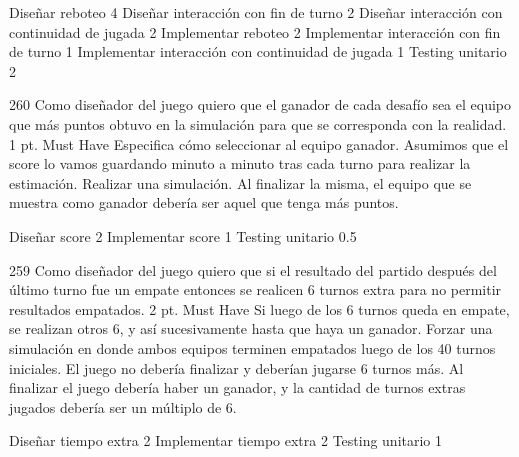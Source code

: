 \begin{taskstable}
 \task
 {Diseñar reboteo}
 {4}
 \task
 {Diseñar interacción con fin de turno}
 {2}
 \task
 {Diseñar interacción con continuidad de jugada}
 {2}
 \task
 {Implementar reboteo}
 {2}
 \task
 {Implementar interacción con fin de turno}
 {1}
 \task
 {Implementar interacción con continuidad de jugada}
 {1}
 \task
 {Testing unitario}
 {2}
\end{taskstable}

\vspace{1cm}


\sprintstory
{260}
{Como diseñador del juego quiero que el ganador de cada desafío sea el equipo que más puntos obtuvo en la simulación para que se corresponda con la realidad.}
{1 pt.}
{Must Have}
{Especifica cómo seleccionar al equipo ganador. 
Asumimos que el score lo vamos guardando minuto a minuto tras cada turno para realizar la estimación.}
{Realizar una simulación. Al finalizar la misma, el equipo que se muestra como ganador debería ser aquel que tenga más puntos.}

\begin{taskstable}
 \task
 {Diseñar score}
 {2}
 \task
 {Implementar score}
 {1}
 \task
 {Testing unitario}
 {0.5}
\end{taskstable}

\vspace{1cm}


\sprintstory
{259}
{Como diseñador del juego quiero que si el resultado del partido después del último turno fue un empate entonces se realicen 6 turnos extra para no permitir resultados empatados.}
{2 pt.}
{Must Have}
{Si luego de los 6 turnos queda en empate, se realizan otros 6, y así sucesivamente hasta que haya un ganador.}
{Forzar una simulación en donde ambos equipos terminen empatados luego de los 40 turnos iniciales. El juego no debería finalizar y deberían jugarse 6 turnos más. Al finalizar el juego debería haber un ganador, y la cantidad de turnos extras jugados debería ser un múltiplo de 6.}

\begin{taskstable}
 \task
 {Diseñar tiempo extra}
 {2}
 \task
 {Implementar tiempo extra}
 {2}
 \task
 {Testing unitario}
 {1}
\end{taskstable}

\vspace{1cm}

